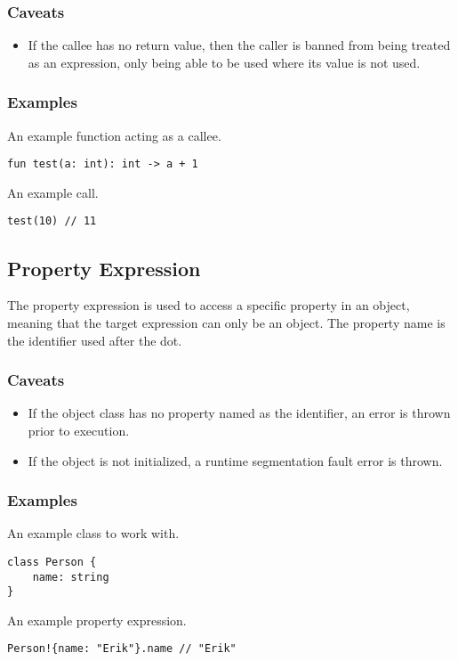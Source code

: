 \subsubsection{Caveats}

\begin{itemize}
    \item If the callee has no return value, then the caller is banned from being treated as an expression, only being
        able to be used where its value is not used.
\end{itemize}

\subsubsection{Examples}

An example function acting as a callee.
\begin{verbatim}
fun test(a: int): int -> a + 1
\end{verbatim}
An example call.
\begin{verbatim}
test(10) // 11
\end{verbatim}

\subsection{Property Expression}

The property expression is used to access a specific property in an object, meaning that the target expression can only be
an object. The property name is the identifier used after the dot.

\subsubsection{Caveats}

\begin{itemize}
    \item If the object class has no property named as the identifier, an error is thrown prior to execution.
    \item If the object is not initialized, a runtime segmentation fault error is thrown.
\end{itemize}

\subsubsection{Examples}

An example class to work with.
\begin{verbatim}
class Person {
    name: string
}
\end{verbatim}
An example property expression.
\begin{verbatim}
Person!{name: "Erik"}.name // "Erik"
\end{verbatim}

